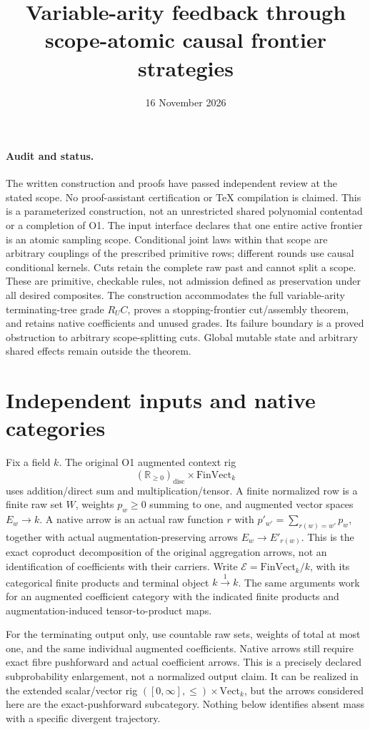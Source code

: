 \documentclass[11pt]{article}
\title{Variable-arity feedback through scope-atomic causal frontier strategies}
\date{16 November 2026}
\newcommand{\E}{\mathcal E}
\begin{document}
\maketitle
\paragraph{Audit and status.}
The written construction and proofs have passed independent review at the stated scope. No proof-assistant certification or TeX compilation is claimed. This is a parameterized construction, not an unrestricted shared polynomial contentad or a completion of O1. The input interface declares that one entire active frontier is an atomic sampling scope. Conditional joint laws within that scope are arbitrary couplings of the prescribed primitive rows; different rounds use causal conditional kernels. Cuts retain the complete raw past and cannot split a scope. These are primitive, checkable rules, not admission defined as preservation under all desired composites. The construction accommodates the full variable-arity terminating-tree grade $R_U C$, proves a stopping-frontier cut/assembly theorem, and retains native coefficients and unused grades. Its failure boundary is a proved obstruction to arbitrary scope-splitting cuts. Global mutable state and arbitrary shared effects remain outside the theorem.

\section{Independent inputs and native categories}
Fix a field $k$. The original O1 augmented context rig
\[
 (\mathbb R_{\geq0})_{\mathrm{disc}}\times\mathrm{FinVect}_k
\]
uses addition/direct sum and multiplication/tensor. A finite normalized row is a finite raw set $W$, weights $p_w\geq0$ summing to one, and augmented vector spaces $E_w\to k$. A native arrow is an actual raw function $r$ with $p'_{w'}=\sum_{r(w)=w'}p_w$, together with actual augmentation-preserving arrows $E_w\to E'_{r(w)}$. This is the exact coproduct decomposition of the original aggregation arrows, not an identification of coefficients with their carriers. Write $\E=\mathrm{FinVect}_k/k$, with its categorical finite products and terminal object $k\xrightarrow{1}k$. The same arguments work for an augmented coefficient category with the indicated finite products and augmentation-induced tensor-to-product maps.

For the terminating output only, use countable raw sets, weights of total at most one, and the same individual augmented coefficients. Native arrows still require exact fibre pushforward and actual coefficient arrows. This is a precisely declared subprobability enlargement, not a normalized output claim. It can be realized in the extended scalar/vector rig $([0,\infty],\leq)\times\mathrm{Vect}_k$, but the arrows considered here are the exact-pushforward subcategory. Nothing below identifies absent mass with a specific divergent trajectory.
\end{document}
